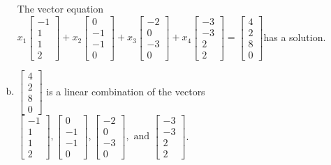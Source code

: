 \begin{exerciseAnswer}
\begin{enumerate}[(a)]
\begin{center}
\begin{minipage}{0.8\textwidth}
 The vector equation \( x_{1} \left[\begin{array}{c}
-1 \\
1 \\
1 \\
2
\end{array}\right] + x_{2} \left[\begin{array}{c}
0 \\
-1 \\
-1 \\
0
\end{array}\right] + x_{3} \left[\begin{array}{c}
-2 \\
0 \\
-3 \\
0
\end{array}\right] + x_{4} \left[\begin{array}{c}
-3 \\
-3 \\
2 \\
2
\end{array}\right] = \left[\begin{array}{c}
4 \\
2 \\
8 \\
0
\end{array}\right] \)has a solution.
\end{minipage}\end{center}
    
\item 

\( \left[\begin{array}{c}
4 \\
2 \\
8 \\
0
\end{array}\right] \) is a linear combination of the vectors \( \left[\begin{array}{c}
-1 \\
1 \\
1 \\
2
\end{array}\right] , \left[\begin{array}{c}
0 \\
-1 \\
-1 \\
0
\end{array}\right] , \left[\begin{array}{c}
-2 \\
0 \\
-3 \\
0
\end{array}\right] , \text{ and } \left[\begin{array}{c}
-3 \\
-3 \\
2 \\
2
\end{array}\right] \). 


\end{enumerate}
    
\end{exerciseAnswer}
    
